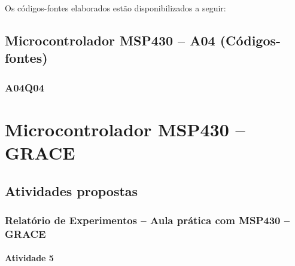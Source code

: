 \documentclass[
	12pt,				%
	openright,			%
  oneside,     %
	a4paper,			%
	english,			%
	french,				%
	spanish,			%
	brazil				%
	]{abntex2}
\begin{document}
\newpage

Os códigos-fontes elaborados estão disponibilizados a seguir:
\section*{Microcontrolador MSP430 -- A04 (Códigos-fontes)}
\label{sec:MSP430-A04Q04}
\subsection*{A04Q04}




%
%

\chapter{Microcontrolador MSP430 -- GRACE} %
\label{cha:5-msp430_grace}

\section{Atividades propostas} %
\label{sec:msp430_grace-atividades_propostas}

\subsection*{Relatório de Experimentos -- Aula prática com MSP430 -- GRACE}

\subsubsection*{Atividade 5}
\end{document}

